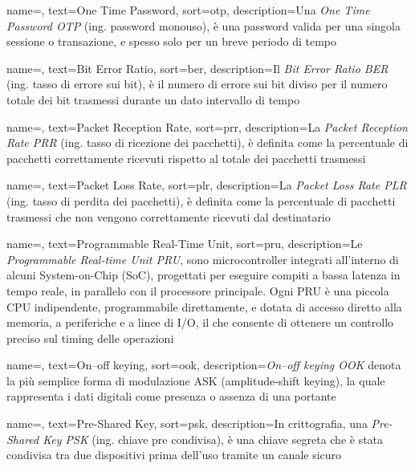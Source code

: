  {
    name=,
    text=One Time Password,
    sort=otp,
    description={Una \emph{One Time Password OTP} (ing. password monouso), è una password valida per una singola sessione o transazione, e spesso solo per un breve periodo di tempo} 
}

 {
    name=,
    text=Bit Error Ratio,
    sort=ber,
    description={Il \emph{Bit Error Ratio BER} (ing. tasso di errore sui bit), è il numero di errore sui bit diviso per il numero totale dei bit trasmessi durante un dato intervallo di tempo}
}

 {
    name=,
    text=Packet Reception Rate,
    sort=prr,
    description={La \emph{Packet Reception Rate PRR} (ing. tasso di ricezione dei pacchetti), è definita come la percentuale di pacchetti correttamente ricevuti rispetto al totale dei pacchetti trasmessi}
}

 {
    name=,
    text=Packet Loss Rate,
    sort=plr,
    description={La \emph{Packet Loss Rate PLR} (ing. tasso di perdita dei pacchetti), è definita come la percentuale di pacchetti trasmessi che non vengono correttamente ricevuti dal destinatario}
}

 {
    name=,
    text=Programmable Real-Time Unit,
    sort=pru,
    description={Le \emph{Programmable Real-time Unit PRU}, sono microcontroller integrati all'interno di alcuni System-on-Chip (SoC), progettati per eseguire compiti a bassa latenza in tempo reale, in parallelo con il processore principale. Ogni PRU è una piccola CPU indipendente, programmabile direttamente, e dotata di accesso diretto alla memoria, a periferiche e a linee di I/O, il che consente di ottenere un controllo preciso sul timing delle operazioni}
}

 {
    name=,
    text=On–off keying,
    sort=ook,
    description={\emph{On–off keying OOK} denota la più semplice forma di modulazione ASK (amplitude-shift keying), la quale rappresenta i dati digitali come presenza o assenza di una portante}
}

 {
    name=,
    text=Pre-Shared Key,
    sort=psk,
    description={In crittografia, una \emph{Pre-Shared Key PSK} (ing. chiave pre condivisa), è una chiave segreta che è stata condivisa tra due dispositivi prima dell'uso tramite un canale sicuro}
}

